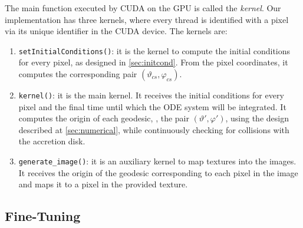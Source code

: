 The main function executed by \ac{CUDA} on the \ac{GPU} is called the \emph{kernel}. Our implementation has three kernels, where every thread is identified with a pixel via its unique identifier in the \ac{CUDA} device. The kernels are:
\begin{enumerate}
	\item \lstinline{setInitialConditions()}: it is the kernel to compute the initial conditions for every pixel, as designed in \autoref{sec:initcond}. From the pixel coordinates, it computes the corresponding pair $(\vartheta_{cs}, \varphi_{cs})$.
	\item  \lstinline{kernel()}: it is the main kernel. It receives the initial conditions for every pixel and the final time until which the \ac{ODE} system will be integrated. It computes the origin of each geodesic, \ie, the pair $(\vartheta', \varphi')$, using the design described at \autoref{sec:numerical}, while continuously checking for collisions with the accretion disk.
	\item \lstinline{generate_image()}: it is an auxiliary kernel to map textures into the images. It receives the origin of the geodesic corresponding to each pixel in the image and maps it to a pixel in the provided texture.
\end{enumerate}

\subsection{Fine-Tuning}